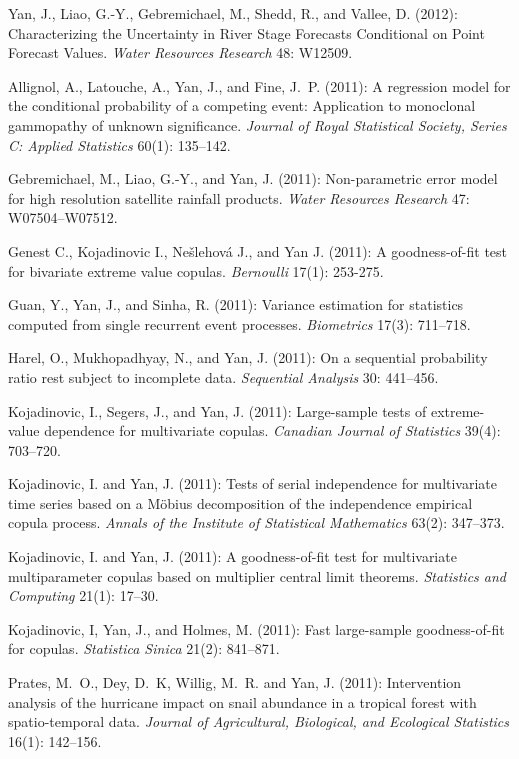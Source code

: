\documentclass[Statistics]{vita}
\begin{document}
\begin{vita}
\begin{Publications}
\begin{RefereedJournalArticles}
  \item Yan, J., Liao, G.-Y., Gebremichael, M., Shedd, R., and Vallee, D. (2012): Characterizing the Uncertainty in River Stage Forecasts Conditional on Point Forecast Values. {\em Water Resources Research\/} 48: W12509.
  \item Allignol, A., Latouche, A., Yan, J., and Fine, J.~P. (2011):  A regression model for the conditional probability of a competing event: {A}pplication to monoclonal gammopathy of unknown significance. {\em Journal of Royal Statistical Society, Series C: Applied Statistics\/}  60(1): 135--142.
  \item Gebremichael, M., Liao, G.-Y., and Yan, J. (2011): Non-parametric error model for high resolution satellite rainfall products. {\em Water Resources Research\/} 47: W07504--W07512.
  \item Genest C., Kojadinovic I., Ne\v{s}lehov\'a J., and Yan J. (2011): A goodness-of-fit test for bivariate extreme value copulas. {\em Bernoulli\/} 17(1): 253-275.
  \item Guan, Y., Yan, J., and Sinha, R. (2011): Variance estimation for statistics computed from single recurrent event processes. {\em Biometrics\/} 17(3): 711--718.
  \item Harel, O., Mukhopadhyay, N., and Yan, J. (2011): On a sequential probability ratio rest subject to incomplete data. {\em Sequential Analysis\/} 30: 441--456.
  \item Kojadinovic, I., Segers, J., and Yan, J. (2011): Large-sample tests of extreme-value dependence for multivariate copulas. {\em Canadian Journal of Statistics\/} 39(4): 703--720.
  \item Kojadinovic, I. and Yan, J. (2011): Tests of serial independence for multivariate time series based on a {M\"obius} decomposition of the independence empirical copula process. {\em Annals of the Institute of Statistical Mathematics\/} 63(2): 347--373.
  \item Kojadinovic, I. and Yan, J. (2011): A goodness-of-fit test for multivariate multiparameter copulas based on multiplier central limit theorems. {\em Statistics and Computing\/} 21(1): 17--30.
  \item Kojadinovic, I, Yan, J., and Holmes, M. (2011): Fast large-sample goodness-of-fit for copulas. {\em Statistica Sinica\/} 21(2): 841--871.
  \item *Prates, M.~O., Dey, D.~K, Willig, M.~R. and Yan, J. (2011): Intervention analysis of the hurricane impact on snail abundance in a tropical forest with spatio-temporal data.  {\em Journal of Agricultural, Biological, and Ecological Statistics\/} 16(1): 142--156.

\end{RefereedJournalArticles}
\end{Publications}
\end{vita}
\end{document}
